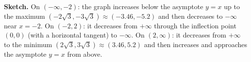 \begin{solution}
\textbf{Sketch.} On $(-\infty,-2)$: the graph increases below the asymptote $y=x$ up to the maximum $(-2\sqrt3,-3\sqrt3)\approx(-3.46,-5.2)$ and then decreases to $-\infty$ near $x=-2$. On $(-2,2)$: it decreases from $+\infty$ through the inflection point $(0,0)$ (with a horizontal tangent) to $-\infty$. On $(2,\infty)$: it decreases from $+\infty$ to the minimum $(2\sqrt3,3\sqrt3)\approx(3.46,5.2)$ and then increases and approaches the asymptote $y=x$ from above.
\end{solution}
